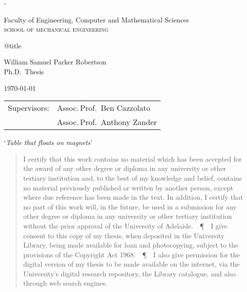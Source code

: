 
\pagestyle{empty}
\label{titlepage}
\calccentering{\unitlength}
\begin{adjustwidth*}{\unitlength}{-\unitlength}
\setlength{\parindent}{0pt}

\begin{flushright}
\end{flushright}

\vfill

Faculty of Engineering,
Computer and Mathematical Sciences\\
\textsc{school of mechanical engineering}

\vfill

{\Large\raggedright\csname @title\endcsname}

\vspace{10mm}

William Samuel Parker Robertson\\
Ph.D.\ Thesis
\vspace{10mm}

\today

\vfill

\vfill

\begin{tabular}{@{}ll}
Supervisors:    & Assoc.\,Prof.\ Ben Cazzolato  \\
                & Assoc.\,Prof.\ Anthony Zander
\end{tabular}
\end{adjustwidth*}

\cleardoublepage

\def\PPP{\unskip~\,\textup\P~\,}
\small
\null
\begin{center}
\large`\textit{Table that floats on magnets}'
\end{center}
\begin{quote}
\nonfrenchspacing
\parfillskip=0pt
I certify that this work contains no material which has been accepted for the award of any other degree or diploma in any university or other tertiary institution and, to the best of my knowledge and belief, contains no material previously published or written by another person, except where due reference has been made in the text. In addition, I certify that no part of this work will, in the future, be used in a submission for any other degree or diploma in any university or other tertiary institution without the prior approval of the University of Adelaide.
\PPP
I give consent to this copy of my thesis, when deposited in the University Library, being made available for loan and photocopying, subject to the provisions of the Copyright Act 1968.
\PPP
I also give permission for the digital version of my thesis to be made available on the internet, via the University’s digital research repository, the Library catalogue, and also through web search engines.
\end{quote}
\vfill

